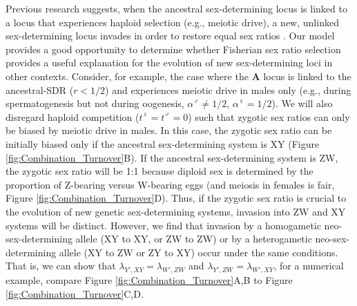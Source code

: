 \documentclass[12pt]{article}
\begin{document}



Previous research suggests, when the ancestral sex-determining locus is linked to a locus that experiences haploid selection (e.g., meiotic drive), a new, unlinked sex-determining locus invades in order to restore equal sex ratios \citep{Kozielska:2010vm}. 
Our model provides a good opportunity to determine whether Fisherian sex ratio selection provides a useful explanation for the evolution of new sex-determining loci in other contexts. 
Consider, for example, the case where the \textbf{A} locus is linked to the ancestral-SDR ($r<1/2$) and experiences meiotic drive in males only (e.g., during spermatogenesis but not during oogenesis, $\alpha^\male \neq 1/2$, $\alpha^\female=1/2$). 
We will also disregard haploid competition ($t^\female=t^\male=0$) such that zygotic sex ratios can only be biased by meiotic drive in males. 
In this case, the zygotic sex ratio can be initially biased only if the ancestral sex-determining system is XY (Figure \ref{fig:Combination_Turnover}B). 
If the ancestral sex-determining system is ZW, the zygotic sex ratio will be 1:1 because diploid sex is determined by the proportion of Z-bearing versus W-bearing eggs (and meiosis in females is fair, Figure \ref{fig:Combination_Turnover}D).
Thus, if the zygotic sex ratio is crucial to the evolution of new genetic sex-determining systems, invasion into ZW and XY systems will be distinct. 
However, we find that invasion by a homogametic neo-sex-determining allele (XY to XY, or ZW to ZW) or by a heterogametic neo-sex-determining allele (XY to ZW or ZY to XY) occur under the same conditions. 
That is, we can show that $\lambda_{Y',XY}=\lambda_{W',ZW}$ and $\lambda_{Y',ZW}=\lambda_{W',XY}$, for a numerical example, compare Figure \ref{fig:Combination_Turnover}A,B to Figure \ref{fig:Combination_Turnover}C,D.
\end{document}

